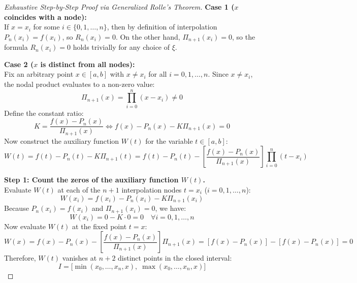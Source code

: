 \begin{proof}[Exhaustive Step-by-Step Proof via Generalized Rolle's Theorem]
\textbf{Case 1 ($x$ coincides with a node):} \\
If $x = x_i$ for some $i \in \{0, 1, \dots, n\}$, then by definition of interpolation $P_n(x_i) = f(x_i)$, so $R_n(x_i) = 0$. On the other hand, $\Pi_{n+1}(x_i) = 0$, so the formula $R_n(x_i) = 0$ holds trivially for any choice of $\xi$.

\medskip
\noindent\textbf{Case 2 ($x$ is distinct from all nodes):} \\
Fix an arbitrary point $x \in [a, b]$ with $x \ne x_i$ for all $i = 0, 1, \dots, n$. Since $x \ne x_i$, the nodal product evaluates to a non-zero value:
\begin{equation}
    \Pi_{n+1}(x) = \prod_{i=0}^n (x - x_i) \ne 0
\end{equation}
Define the constant ratio:
\begin{equation}
    K = \frac{f(x) - P_n(x)}{\Pi_{n+1}(x)} \iff f(x) - P_n(x) - K \Pi_{n+1}(x) = 0
\end{equation}
Now construct the auxiliary function $W(t)$ for the variable $t \in [a, b]$:
\begin{equation}
    W(t) = f(t) - P_n(t) - K \Pi_{n+1}(t) = f(t) - P_n(t) - \left[ \frac{f(x) - P_n(x)}{\Pi_{n+1}(x)} \right] \prod_{i=0}^n (t - x_i)
\end{equation}

\noindent\textbf{Step 1: Count the zeros of the auxiliary function $W(t)$.} \\
Evaluate $W(t)$ at each of the $n+1$ interpolation nodes $t = x_i$ ($i = 0, 1, \dots, n$):
\begin{equation}
    W(x_i) = f(x_i) - P_n(x_i) - K \Pi_{n+1}(x_i)
\end{equation}
Because $P_n(x_i) = f(x_i)$ and $\Pi_{n+1}(x_i) = 0$, we have:
\begin{equation}
    W(x_i) = 0 - K \cdot 0 = 0 \quad \forall i = 0, 1, \dots, n
\end{equation}
Now evaluate $W(t)$ at the fixed point $t = x$:
\begin{equation}
    W(x) = f(x) - P_n(x) - \left[ \frac{f(x) - P_n(x)}{\Pi_{n+1}(x)} \right] \Pi_{n+1}(x) = [f(x) - P_n(x)] - [f(x) - P_n(x)] = 0
\end{equation}
Therefore, $W(t)$ vanishes at $n + 2$ distinct points in the closed interval:
\begin{equation}
    I = \big[ \min(x_0,\dots,x_n,x), \; \max(x_0,\dots,x_n,x) \big]
\end{equation}


\end{proof}
